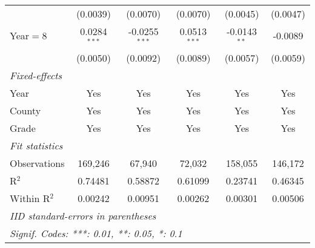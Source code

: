 \begin{table}[htbp]
\begin{tabular}{lccccc}
                           & (0.0039)        & (0.0070)        & (0.0070)       & (0.0045)        & (0.0047)\\
      Year$=$8             & 0.0284$^{***}$  & -0.0255$^{***}$ & 0.0513$^{***}$ & -0.0143$^{**}$  & -0.0089\\
                           & (0.0050)        & (0.0092)        & (0.0089)       & (0.0057)        & (0.0059)\\
      \midrule \emph{Fixed-effects} &   &   &   &   &  \\
      Year                 & Yes             & Yes             & Yes            & Yes             & Yes\\
      County               & Yes             & Yes             & Yes            & Yes             & Yes\\
      Grade                & Yes             & Yes             & Yes            & Yes             & Yes\\
      \midrule \emph{Fit statistics} &   &   &   &   &  \\
      Observations         & 169,246         & 67,940          & 72,032         & 158,055         & 146,172\\
      R$^2$                & 0.74481         & 0.58872         & 0.61099        & 0.23741         & 0.46345\\
      Within R$^2$         & 0.00242         & 0.00951         & 0.00262        & 0.00301         & 0.00506\\
      \midrule\midrule\multicolumn{6}{l}{\emph{IID standard-errors in parentheses}}\\
      \multicolumn{6}{l}{\emph{Signif. Codes: ***: 0.01, **: 0.05, *: 0.1}}\\
   \end{tabular}
\end{table}


